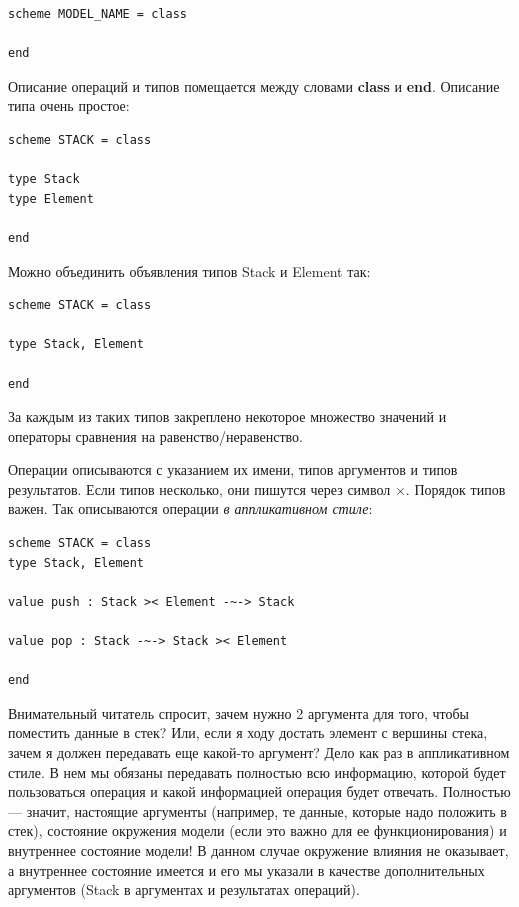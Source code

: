 \documentclass[14pt, twoside]{extreport}
\begin{document}
\begin{lstlisting}
scheme MODEL_NAME = class

end
\end{lstlisting}

Описание операций и типов помещается между словами \textbf{class} и \textbf{end}. Описание типа очень простое:

\begin{lstlisting}
scheme STACK = class

type Stack
type Element

end
\end{lstlisting}

Можно объединить объявления типов Stack и Element так:

\begin{lstlisting}
scheme STACK = class

type Stack, Element

end
\end{lstlisting}

За каждым из таких типов закреплено некоторое множество значений и операторы сравнения на равенство/неравенство.

Операции описываются с указанием их имени, типов аргументов и типов результатов. Если типов несколько, они пишутся через символ $\times$. Порядок типов важен. Так описываются операции \emph{в аппликативном стиле}:

\begin{lstlisting}
scheme STACK = class
type Stack, Element

value push : Stack >< Element -~-> Stack

value pop : Stack -~-> Stack >< Element

end
\end{lstlisting}

Внимательный читатель спросит, зачем нужно 2 аргумента для того, чтобы поместить данные в стек? Или, если я ходу достать элемент с вершины стека, зачем я должен передавать еще какой-то аргумент? Дело как раз в аппликативном стиле. В нем мы обязаны передавать полностью всю информацию, которой будет пользоваться операция и какой информацией операция будет отвечать. Полностью --- значит, настоящие аргументы (например, те данные, которые надо положить в стек), состояние окружения модели (если это важно для ее функционирования) и внутреннее состояние модели! В данном случае окружение влияния не оказывает, а внутреннее состояние имеется и его мы указали в качестве дополнительных аргументов (Stack в аргументах и результатах операций).
\end{document}
